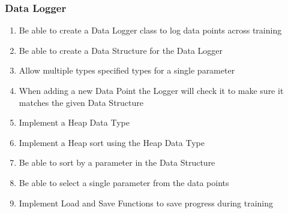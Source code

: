 \begin{flushleft}
            \subsubsection*{Data Logger}
                \begin{enumerate}
                    \item Be able to create a Data Logger class to log data points across training
                    \item Be able to create a Data Structure for the Data Logger
                    \item Allow multiple types specified types for a single parameter
                    \item When adding a new Data Point the Logger will check it to make sure it matches the given Data Structure
                    \item Implement a Heap Data Type
                    \item Implement a Heap sort using the Heap Data Type
                    \item Be able to sort by a parameter in the Data Structure
                    \item Be able to select a single parameter from the data points
                    \item Implement Load and Save Functions to save progress during training
                \end{enumerate}   
\end{flushleft}